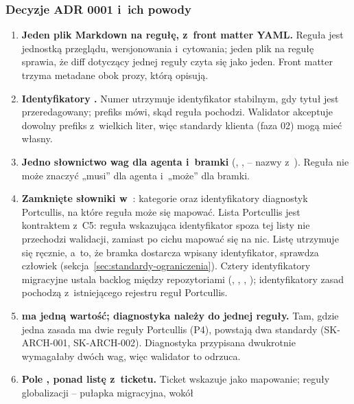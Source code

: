 \subsubsection{Decyzje ADR 0001 i~ich powody}

\begin{enumerate}
  \item \textbf{Jeden plik Markdown na regułę, z~front matter YAML.} Reguła jest jednostką
        przeglądu, wersjonowania i~cytowania; jeden plik na regułę sprawia, że diff dotyczący
        jednej reguły czyta się jako jeden. Front matter trzyma metadane obok prozy, którą
        opisują.
  \item \textbf{Identyfikatory .} Numer utrzymuje identyfikator stabilnym,
        gdy tytuł jest przeredagowany; prefiks mówi, skąd reguła pochodzi. Walidator
        akceptuje dowolny prefiks z~wielkich liter, więc standardy klienta (faza 02) mogą
        mieć własny.
  \item \textbf{Jedno słownictwo wag dla agenta i~bramki} (, ,
         -- nazwy z~). Reguła nie może znaczyć
        „musi” dla agenta i~„może” dla bramki.
  \item \textbf{Zamknięte słowniki w~}: kategorie oraz identyfikatory
        diagnostyk Portcullis, na które reguła może się mapować. Lista Portcullis jest
        kontraktem z~C5: reguła wskazująca identyfikator spoza tej listy nie przechodzi
        walidacji, zamiast po cichu mapować się na nic. Listę utrzymuje się ręcznie, a~to, że
        bramka dostarcza wpisany identyfikator, sprawdza człowiek
        (sekcja~\ref{sec:standardy-ograniczenia}). Cztery identyfikatory
        migracyjne ustala backlog między repozytoriami
        (, ,
        , );
        identyfikatory zasad pochodzą z~istniejącego rejestru reguł Portcullis.
  \item \textbf{ ma jedną wartość; diagnostyka należy do jednej
        reguły.} Tam, gdzie jedna zasada ma dwie reguły Portcullis (P4), powstają dwa
        standardy (SK-ARCH-001, SK-ARCH-002). Diagnostyka przypisana dwukrotnie wymagałaby
        dwóch wag, więc walidator to odrzuca.
  \item \textbf{Pole , ponad listę z~ticketu.} Ticket wskazuje
         jako mapowanie; reguły globalizacji -- pułapka migracyjna, wokół

\end{enumerate}

